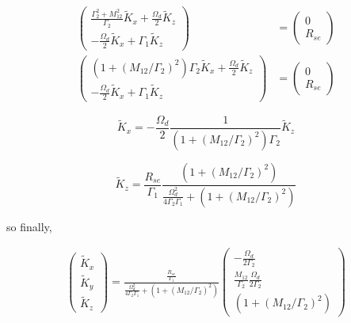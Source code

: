 \documentclass{article}
\begin{document}
\begin{align}
     \left(\begin{array}{c}
        \frac{\Gamma_2^2 + M_{12}^2}{\Gamma_2}\tilde{K}_{x} + \frac{\Omega_d}{2}\tilde{K}_{z}\\
        -\frac{\Omega_d}{2}\tilde{K}_{x}+\Gamma_1\tilde{K}_{z}
    \end{array}\right)&=
    \left(\begin{array}{c}
        0\\
        R_{se} 
    \end{array}\right)\\
    \left(\begin{array}{c}
        \left(1 + \left(M_{12}/\Gamma_2\right)^2\right)\Gamma_2\tilde{K}_{x} + \frac{\Omega_d}{2}\tilde{K}_{z}\\
        -\frac{\Omega_d}{2}\tilde{K}_{x}+\Gamma_1\tilde{K}_{z}
    \end{array}\right)&=
    \left(\begin{array}{c}
        0\\
        R_{se} 
    \end{array}\right)
\end{align}

$$\tilde{K}_{x} = -\frac{\Omega_d}{2}\frac{1}{\left(1 + \left(M_{12}/\Gamma_2\right)^2\right)\Gamma_2}\tilde{K}_{z}$$

$$\tilde{K}_{z} = \frac{R_{se}}{\Gamma_1} \frac{\left(1 + \left(M_{12}/\Gamma_2\right)^2\right)}{\frac{\Omega_d^2}{4\Gamma_2\Gamma_1} + \left(1 + \left(M_{12}/\Gamma_2\right)^2\right)} $$

so finally,

\begin{align}
    \boxed{\left(\begin{array}{c}
        \tilde{K}_{x}\\
        \tilde{K}_{y}\\
        \tilde{K}_{z} 
    \end{array}\right)=
    \frac{\frac{R_{se}}{\Gamma_1}}{\frac{\Omega_d^2}{4\Gamma_2\Gamma_1} + \left(1 + \left(M_{12}/\Gamma_2\right)^2\right)}
    \left(\begin{array}{c}
    -\frac{\Omega_d}{2\Gamma_2}\\
      \frac{M_{12}}{\Gamma_2}\frac{\Omega_d}{2\Gamma_2} \\
         \left(1 + \left(M_{12}/\Gamma_2\right)^2\right)
    \end{array}\right)}\label{eq:Bloch_solution_y_drive}
\end{align}
\end{document}
